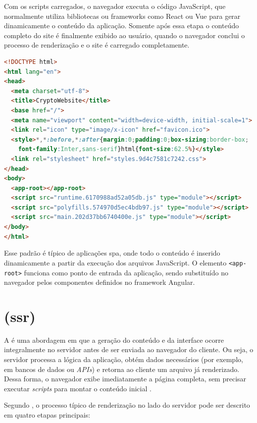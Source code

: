 Com os scripts carregados, o navegador executa o código JavaScript, que normalmente utiliza bibliotecas ou frameworks como React ou Vue para gerar dinamicamente o conteúdo da aplicação. Somente após essa etapa o conteúdo completo do site é finalmente exibido ao usuário, quando o navegador conclui o processo de renderização e o site é carregado completamente.

\begin{lstlisting}[language=html, caption={Exemplo de HTML mínimo em aplicação Angular com CSR}, label={lst:angular_html}]
<!DOCTYPE html>
<html lang="en">
<head>
  <meta charset="utf-8">
  <title>CryptoWebsite</title>
  <base href="/">
  <meta name="viewport" content="width=device-width, initial-scale=1">
  <link rel="icon" type="image/x-icon" href="favicon.ico">
  <style>*,*:before,*:after{margin:0;padding:0;box-sizing:border-box;
    font-family:Inter,sans-serif}html{font-size:62.5%}</style>
  <link rel="stylesheet" href="styles.9d4c7581c7242.css">
</head>
<body>
  <app-root></app-root>
  <script src="runtime.6170988ad52a05db.js" type="module"></script>
  <script src="polyfills.574970d5ec4bdb97.js" type="module"></script>
  <script src="main.202d37bb6740400e.js" type="module"></script>
</body>
</html>
\end{lstlisting}

Esse padrão é típico de aplicações \acrshort{spa}, onde todo o conteúdo é inserido dinamicamente a partir da execução dos arquivos JavaScript. O elemento \texttt{<app-root>} funciona como ponto de entrada da aplicação, sendo substituído no navegador pelos componentes definidos no framework Angular. {\cite{atori2024}}


\section{ (\acrshort{ssr})}
\label{subsec:ssr}

A \textbf{} é uma abordagem em que a geração do conteúdo e da interface ocorre integralmente no servidor antes de ser enviada ao navegador do cliente. Ou seja, o servidor processa a lógica da aplicação, obtém dados necessários (por exemplo, em bancos de dados ou \emph{APIs}) e retorna ao cliente um arquivo  já renderizado. Dessa forma, o navegador exibe imediatamente a página completa, sem precisar executar \emph{scripts} para montar o conteúdo inicial \cite{atori2024}. 

Segundo , o processo típico de renderização no lado do servidor pode ser descrito em quatro etapas principais:

